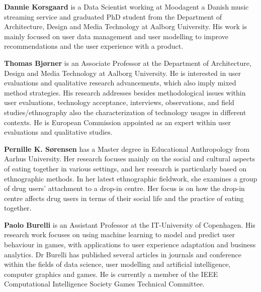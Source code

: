 \FloatBarrier


%
%
\vspace{5mm}
\noindent\textbf{Dannie Korsgaard} is a Data Scientist working at Moodagent a Danish music streaming service and graduated PhD student from the Department of Architecture, Design and Media Technology at Aalborg University. His work is mainly focused on user data management and user modelling to improve recommendations and the user experience with a product.

\vspace{5mm}
\noindent\textbf{Thomas Bjørner} is an Associate Professor at the Department of Architecture, Design and Media Technology at Aalborg University. He is interested in user evaluations and qualitative research advancements, which also imply mixed method strategies. His research addresses besides methodological issues within user evaluations, technology acceptance, interviews, observations, and field studies/ethnography also the characterization of technology usages in different contexts. He is European Commission appointed as an expert within user evaluations and qualitative studies.

\vspace{5mm}
\noindent\textbf{Pernille K. Sørensen} has a Master degree in Educational Anthropology from Aarhus University. Her research focuses mainly on the social and cultural aspects of eating together in various settings, and her research is particularly based on ethnographic methods. In her latest ethnographic fieldwork, she examines a group of drug users’ attachment to a drop-in centre. Her focus is on how the drop-in centre affects drug users in terms of their social life and the practice of eating together.

\vspace{5mm}
\noindent\textbf{Paolo Burelli} is an Assistant Professor at the IT-University of Copenhagen. His research work focuses on using machine learning to model and predict user behaviour in games, with applications to user experience adaptation and business analytics. Dr Burelli has published several articles in journals and conference within the fields of data science, user modelling and artificial intelligence, computer graphics and games. He is currently a member of the IEEE Computational Intelligence Society Games Technical Committee.


